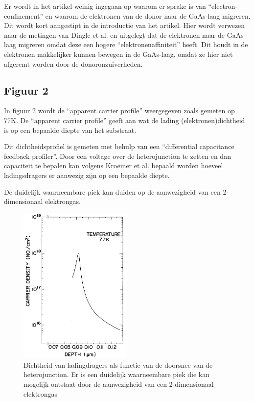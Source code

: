 \documentclass[11pt]{article}
\begin{document}
Er wordt in het artikel weinig ingegaan op waarom er sprake is van ``electron-confinement'' en waarom de elektronen van de donor naar de GaAs-laag migreren. Dit wordt kort aangestipt in de introductie van het artikel. Hier wordt verwezen naar de metingen van Dingle et al. en uitgelegt dat de elektronen naar de GaAs-laag migreren omdat deze een hogere ``elektronenaffiniteit'' heeft. Dit houdt in de elektronen makkelijker kunnen bewegen in de GaAs-laag, omdat ze hier niet afgeremt worden door de donoronzuiverheden.

\subsection{Figuur 2}
In figuur 2 wordt de ``apparent carrier profile'' weergegeven zoals gemeten op 77K. De ``apparent carrier profile'' geeft aan wat de lading (elektronen)dichtheid is op een bepaalde diepte van het substraat.

Dit dichtheidsprofiel is gemeten met behulp van een ``differential capacitance feedback profiler''. Door een voltage over de heterojunction te zetten en dan capaciteit te bepalen kan volgens Kro\"emer et al. bepaald worden hoeveel ladingsdragers er aanwezig zijn op een bepaalde diepte.

De duidelijk waarneembare piek kan duiden op de aanwezigheid van een 2-dimensionaal elektrongas.

\begin{figure}[h]
  \begin{center}
\includegraphics[width=0.5\textwidth]{carrier_profile_depth.png}
\caption{Dichtheid van ladingdragers als functie van de doorsnee van de heterojunction. Er is een duidelijk waarneembare piek die kan mogelijk ontstaat door de aanwezigheid van een 2-dimensionaal elektrongas}
\label{fig:carrierprofile}
  \end{center}
\end{figure}
\end{document}
